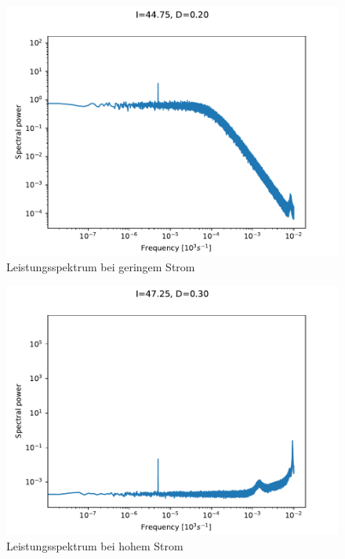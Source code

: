 \documentclass[12pt,a4paper]{article}
\begin{document}
\begin{figure}[H]
	\centering
	\includegraphics[scale=1]{spanhopfd20klein.pdf}\caption{Leistungsspektrum bei geringem Strom}
	\label{powerspD02klein}
\end{figure}
\begin{figure}[H]
	\centering
	\includegraphics[scale=1]{spanhopfd30hoch.pdf}\caption{Leistungsspektrum bei hohem Strom}
	\label{powerspD03hoch}
\end{figure}
\end{document}

